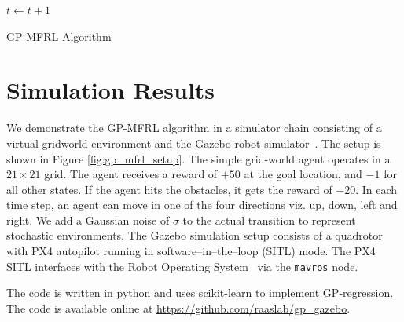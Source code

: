 \documentclass[12pt]{report}
\begin{document}
\begin{algorithm}
{{

$t \leftarrow t + 	1$ \;



}}
\caption{GP-MFRL Algorithm}\label{GP-MFRL}
\end{algorithm}



\section{Simulation Results} \label{gp-mfrl-sim}
We demonstrate the GP-MFRL algorithm in a simulator chain consisting of a virtual gridworld environment and the Gazebo robot simulator~\cite{koenig2004design}. The setup is shown in Figure \ref{fig:gp_mfrl_setup}. The simple grid-world agent operates in a $21\times 21$ grid. The agent receives a reward of $+50$ at the goal location, and $-1$ for all other states. If the agent hits the obstacles, it gets the reward of $-20$. In each time step, an agent can move in one of the four directions viz. up, down, left and right. We add a Gaussian noise of $\sigma$ to the actual transition to represent stochastic environments. The Gazebo simulation setup consists of a quadrotor with PX4 autopilot running in software--in--the--loop (SITL) mode. The PX4 SITL interfaces with the Robot Operating System~\cite{quigley2009ros} via the \texttt{mavros} node. 

The code is written in python and uses scikit-learn \cite{scikit-learn} to implement GP-regression. The code is available online at \url{https://github.com/raaslab/gp_gazebo}.
\end{document}
